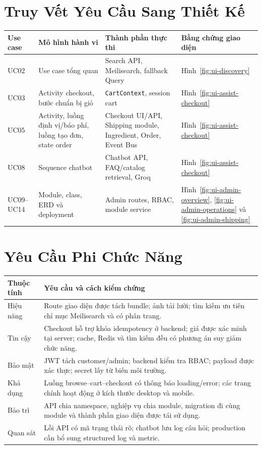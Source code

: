 \section{Truy Vết Yêu Cầu Sang Thiết Kế}

\begin{longtable}{@{}L{0.15\textwidth}L{0.27\textwidth}L{0.25\textwidth}L{0.25\textwidth}@{}}
  \toprule
  \textbf{Use case} & \textbf{Mô hình hành vi} & \textbf{Thành phần thực thi} & \textbf{Bằng chứng giao diện} \\
  \midrule
  UC02 & Use case tổng quan & Search API, Meilisearch, fallback Query & Hình~\ref{fig:ui-discovery} \\
  UC03 & Activity checkout, bước chuẩn bị giỏ & \texttt{CartContext}, session cart & Hình~\ref{fig:ui-assist-checkout} \\
  UC05 & Activity, luồng định vị/báo phí, luồng tạo đơn, state order & Checkout UI/API, Shipping module, Ingredient, Order, Event Bus & Hình~\ref{fig:ui-assist-checkout} \\
  UC08 & Sequence chatbot & Chatbot API, FAQ/catalog retrieval, Groq & Hình~\ref{fig:ui-assist-checkout} \\
  UC09--UC14 & Module, class, ERD và deployment & Admin routes, RBAC, module service & Hình~\ref{fig:ui-admin-overview}, \ref{fig:ui-admin-operations} và \ref{fig:ui-admin-shipping} \\
  \bottomrule
\end{longtable}

\section{Yêu Cầu Phi Chức Năng}

\begin{longtable}{@{}L{0.22\textwidth} L{0.70\textwidth}@{}}
  \toprule
  \textbf{Thuộc tính} & \textbf{Yêu cầu và cách kiểm chứng} \\
  \midrule
  \endhead
  Hiệu năng & Route giao diện được tách bundle; ảnh tải lười; tìm kiếm ưu tiên chỉ mục Meilisearch và có phân trang. \\
  Tin cậy & Checkout hỗ trợ khóa idempotency ở backend; giá được xác minh tại server; cache, Redis và tìm kiếm đều có phương án suy giảm chức năng. \\
  Bảo mật & JWT tách customer/admin; backend kiểm tra RBAC; payload được xác thực; secret lấy từ biến môi trường. \\
  Khả dụng & Luồng browse--cart--checkout có thông báo loading/error; các trang chính hoạt động ở kích thước desktop và mobile. \\
  Bảo trì & API chia namespace, nghiệp vụ chia module, migration đi cùng module và thành phần giao diện được tái sử dụng. \\
  Quan sát & Lỗi API có mã trạng thái rõ; chatbot lưu log câu hỏi; production cần bổ sung structured log và metric. \\
  \bottomrule
\end{longtable}

